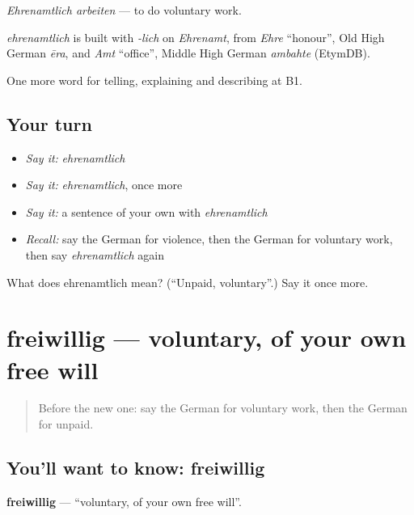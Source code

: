 \emph{Ehrenamtlich arbeiten} — to do voluntary work.

\begin{cousinweb}
\emph{ehrenamtlich} is built with \emph{-lich} on \emph{Ehrenamt}, from \emph{Ehre} \textquotedblleft{}honour\textquotedblright{}, Old High German \emph{ēra}, and \emph{Amt} \textquotedblleft{}office\textquotedblright{}, Middle High German \emph{ambahte} (EtymDB).
\end{cousinweb}

\begin{grammarlens}[title={What you've built}]
One more word for telling, explaining and describing at B1.
\end{grammarlens}

\subsection*{Your turn}
\begin{itemize}
\raggedright
  \item \emph{Say it:} \emph{ehrenamtlich}
  \item \emph{Say it:} \emph{ehrenamtlich}, once more
  \item \emph{Say it:} a sentence of your own with \emph{ehrenamtlich}
  \item \emph{Recall:} say the German for violence, then the German for voluntary work, then say \emph{ehrenamtlich} again
\end{itemize}

\begin{tcolorbox}[breakable,colback=teal!4,colframe=teal!35!black,title={Before you move on}]
What does ehrenamtlich mean? (\textquotedblleft{}Unpaid, voluntary\textquotedblright{}.) Say it once more.
\end{tcolorbox}
\section[freiwillig]{freiwillig — voluntary, of your own free will}

\label{lesson:GE-C362-freiwillig}



\begin{quote}
Before the new one: say the German for voluntary work, then the German for unpaid.
\end{quote}

\subsection*{You'll want to know: freiwillig}
\textbf{freiwillig} — \textquotedblleft{}voluntary, of your own free will\textquotedblright{}.

